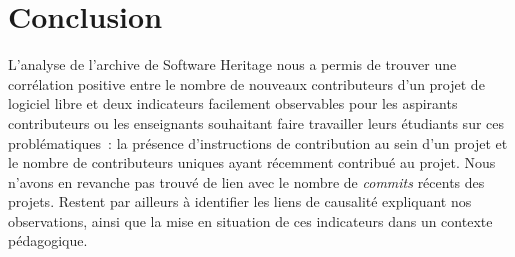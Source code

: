 \documentclass[dvipsnames,runningheads]{llncs}
\newcommand{\en}[1]{\foreignlanguage{english}{\emph{#1}}}
\begin{document}
    \section{Conclusion}

    L'analyse de l'archive de Software Heritage nous a permis de trouver une corrélation positive entre le
    nombre de nouveaux contributeurs d'un projet de logiciel libre et deux indicateurs facilement observables
    pour les aspirants contributeurs ou les enseignants souhaitant faire travailler leurs étudiants sur ces
    problématiques : la présence d'instructions de contribution au sein d'un projet et le nombre de
    contributeurs uniques ayant récemment contribué au projet. Nous n'avons en revanche pas trouvé de lien
    avec le nombre de \en{commits} récents des projets. Restent par ailleurs à identifier les liens de
    causalité expliquant nos observations, ainsi que la mise en situation de ces indicateurs dans un contexte
    pédagogique.

    \printbibliography[heading=bibintoc]
\end{document}
